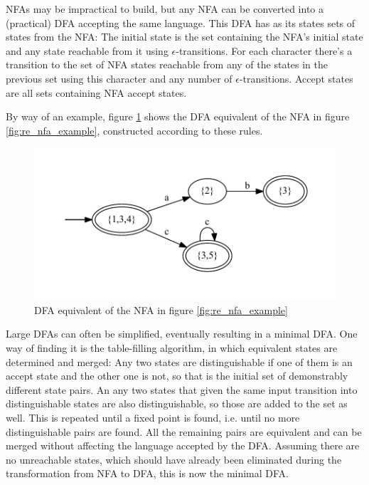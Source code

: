 			NFAs may be impractical to build, but any NFA can be converted into a (practical) DFA accepting the same language. This DFA has as its states sets of states from the NFA: The initial state is the set containing the NFA's initial state and any state reachable from it using $\epsilon$-transitions. For each character there's a transition to the set of NFA states reachable from any of the states in the previous set using this character and any number of $\epsilon$-transitions. Accept states are all sets containing NFA accept states.
			
			By way of an example, figure \ref{fig:re_dfa_example} shows the DFA equivalent of the NFA in figure \ref{fig:re_nfa_example}, constructed according to these rules.
			
			\begin{figure}
			\centering
			\includegraphics[width=\textwidth]{figures/re_example_dfa}
			\caption{DFA equivalent of the NFA in figure \ref{fig:re_nfa_example}}
			\label{fig:re_dfa_example}
			\end{figure}
			
			Large DFAs can often be simplified, eventually resulting in a minimal DFA. One way of finding it is the table-filling algorithm, in which equivalent states are determined and merged: Any two states are distinguishable if one of them is an accept state and the other one is not, so that is the initial set of demonstrably different state pairs. An any two states that given the same input transition into distinguishable states are also distinguishable, so those are added to the set as well. This is repeated until a fixed point is found, i.e. until no more distinguishable pairs are found. All the remaining pairs are equivalent and can be merged without affecting the language accepted by the DFA. Assuming there are no unreachable states, which should have already been eliminated during the transformation from NFA to DFA, this is now the minimal DFA.
			
